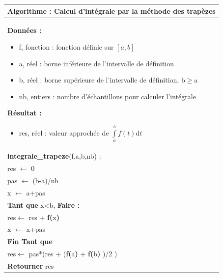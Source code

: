 \documentclass[10pt]{article}
\begin{document}
\begin{pseudo}
\begin{center}
\begin{tabular}{p{}}
\hline
\textbf{Algorithme :} Calcul d'intégrale par la méthode des trapèzes\\
\hline
\textbf{Données :}
\begin{itemize}
\item \textsf{f}, fonction : fonction définie sur $[a,b]$  
\item \textsf{a}, réel : borne inférieure de l'intervalle de définition
\item \textsf{b}, réel : borne supérieure de l'intervalle de définition, \textsf{b$\geq$a}
\item \textsf{nb}, entiers : nombre d'échantillons pour calculer l'intégrale
\end{itemize}
\textbf{Résultat :} 
\begin{itemize}
\item \textsf{res}, réel : valeur approchée de $\int\limits_a^b f(t)\text{d}t$
\end{itemize}
\\
\textbf{integrale\_trapeze}(\textsf{f,a,b,nb}) :\\
\hspace{.4cm}\textsf{res} $\leftarrow$ \textsf{0}\\
\hspace{.4cm}\textsf{pas} $\leftarrow$ \textsf{(b-a)/nb}\\
\hspace{.4cm}\textsf{x} $\leftarrow$ \textsf{a+pas}\\
\hspace{.4cm}\textbf{Tant que} \textsf{x<b}, \textbf{Faire :}\\
\hspace{.8cm}\textsf{res}$\leftarrow$ \textsf{res + }\textbf{f(}\textsf{x}\textbf{)}\\
\hspace{.8cm}\textsf{x} $\leftarrow$ \textsf{x+pas}\\
\hspace{.4cm}\textbf{Fin Tant que} \\
\hspace{.4cm}\textsf{res}$\leftarrow$ \textsf{pas*(res + (}\textbf{f(}\textsf{a}\textbf{)} + \textbf{f(}\textsf{b}\textbf{)} \textsf{)/2 )}\\
\hspace{.4cm}\textbf{Retourner} \textsf{res}\\
\hline
\end{tabular}
\end{center}
\end{pseudo}
\end{document}
